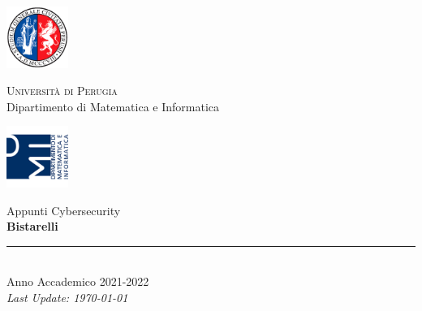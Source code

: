
\thispagestyle{empty} %

\noindent %
\includegraphics[width=0.15\textwidth]{frontmatter/imgs/logoUniPg.jpg}
\begin{minipage}[b]{0.7\textwidth}
    \centering
    {\Large \textsc{Universit{\`a} di Perugia}}\\
    \vspace{0.4 em}
    {\large Dipartimento di Matematica e Informatica}
    \vspace{0.6 em}
\end{minipage}%
\includegraphics[width=0.15\textwidth]{frontmatter/imgs/logoDMI.jpg}

\vspace{8 em}

\begin{center}
    {\Huge Appunti Cybersecurity}\\
    \vspace{5 em}
    {\Huge \textbf{Bistarelli}}\\

    \vfill

    \rule{380pt}{.4pt}\\
    \vspace{1.2 em}
    \large{Anno Accademico 2021-2022}\\
    \vspace{.9 em}
    \small{\textit{Last Update: \today{}}}
\end{center}

